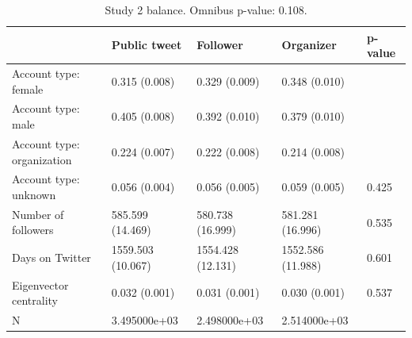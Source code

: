 \begin{table}

\caption{Study 2 balance. Omnibus p-value: 0.108.}
\centering
\begin{tabular}[t]{lllll}
\toprule
 & Public tweet & Follower & Organizer & p-value\\
\midrule
Account type: female & 0.315 (0.008) & 0.329 (0.009) & 0.348 (0.010) & \\
Account type: male & 0.405 (0.008) & 0.392 (0.010) & 0.379 (0.010) & \\
Account type: organization & 0.224 (0.007) & 0.222 (0.008) & 0.214 (0.008) & \\
Account type: unknown & 0.056 (0.004) & 0.056 (0.005) & 0.059 (0.005) & 0.425\\
Number of followers & 585.599 (14.469) & 580.738 (16.999) & 581.281 (16.996) & 0.535\\
\addlinespace
Days on Twitter & 1559.503 (10.067) & 1554.428 (12.131) & 1552.586 (11.988) & 0.601\\
Eigenvector centrality & 0.032 (0.001) & 0.031 (0.001) & 0.030 (0.001) & 0.537\\
N & 3.495000e+03 & 2.498000e+03 & 2.514000e+03 & \\
\bottomrule
\end{tabular}
\end{table}
